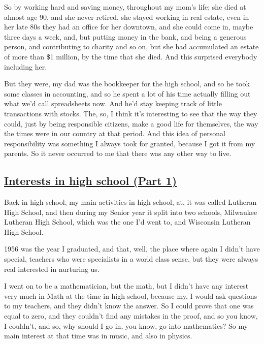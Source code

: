 \documentclass[]{article}
\begin{document}
So by working hard and saving money, throughout my mom's life; she died
at almost age 90, and she never retired, she stayed working in real
estate, even in her late 80s they had an office for her downtown, and
she could come in, maybe three days a week, and, but putting money in
the bank, and being a generous person, and contributing to charity and
so on, but she had accumulated an estate of more than \$1 million, by
the time that she died. And this surprised everybody including her.

But they were, my dad was the bookkeeper for the high school, and so he
took some classes in accounting, and so he spent a lot of his time
actually filling out what we'd call spreadsheets now. And he'd stay
keeping track of little transactions with stocks. The, so, I think it's
interesting to see that the way they could, just by being responsible
citizens, make a good life for themselves, the way the times were in our
country at that period. And this idea of personal responsibility was
something I always took for granted, because I got it from my parents.
So it never occurred to me that there was any other way to live.

\subsection{\texorpdfstring{\href{http://webofstories.com/play/17064}{Interests
in high school (Part
1)}}{Interests in high school (Part 1)}}\label{interests-in-high-school-part-1}

Back in high school, my main activities in high school, at, it was
called Lutheran High School, and then during my Senior year it split
into two schools, Milwaukee Lutheran High School, which was the one I'd
went to, and Wisconsin Lutheran High School.

1956 was the year I graduated, and that, well, the place where again I
didn't have special, teachers who were specialists in a world class
sense, but they were always real interested in nurturing us.

I went on to be a mathematician, but the math, but I didn't have any
interest very much in Math at the time in high school, because my, I
would ask questions to my teachers, and they didn't know the answer. So
I could prove that one was equal to zero, and they couldn't find any
mistakes in the proof, and so you know, I couldn't, and so, why should I
go in, you know, go into mathematics? So my main interest at that time
was in music, and also in physics.
\end{document}
